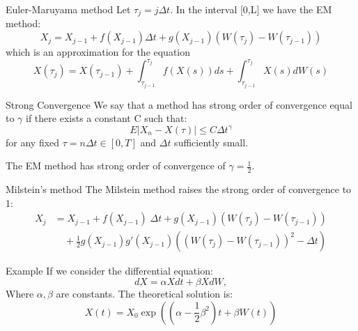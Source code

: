 \begin{frame}{Euler-Maruyama method}
Let $\tau_j=j\Delta t$. In the interval [0,L] we have the EM method:\bigskip\\
$$X_j=X_{j-1}+f(X_{j-1})\Delta t+g(X_{j-1})(W(\tau_j)-W(\tau_{j-1}))$$
 which is an approximation for the equation
$$X(\tau_j)=X(\tau_{j-1})+\int_{\tau_{j-1}}^{\tau_{j}}f(X(s))ds+\int_
{\tau_{j-1}}^{\tau_{j}}X(s)dW(s)$$
\end{frame}

\begin{frame}
\begin{block}{Strong Convergence}
We say that a method has strong order of convergence equal to $\gamma$ if there exists a constant C such that:
$$E|X_n-X(\tau)|\leq C \Delta t^\gamma$$
for any fixed $\tau=n \Delta t \in [0,T]$ and $\Delta t$ sufficiently small.
\end{block}
\bigskip
The EM method has strong order of convergence of $\gamma=\frac{1}{2}$.
\end{frame}

\begin{frame}{Milstein's method}
The Milstein method raises the strong order of convergence to 1:	
	\begin{equation*}
	\begin{split}
	X_{j} & =X_{j-1}+ f(X_{j-1}) \; \Delta t + g(X_{j-1})(W(\tau_j)-W(\tau_{j-1}))\\
	  &\quad +\frac{1}{2}g(X_{j-1})g'(X_{j-1})((W(\tau_j)-W(\tau_{j-1}))^2-\Delta t)
	\end{split}
	\end{equation*}
\end{frame}

\begin{frame}{Example}
If we consider the differential equation:
\begin{equation*}
  dX=\alpha X dt+ \beta X dW,
\end{equation*}
Where $\alpha, \beta$ are constants. The theoretical solution is: 
\begin{equation*}
  X(t)=X_{0}\exp{\left((\alpha -\frac{1}{2}\beta ^2)t +\beta W(t)\right)}
\end{equation*}
\end{frame}

